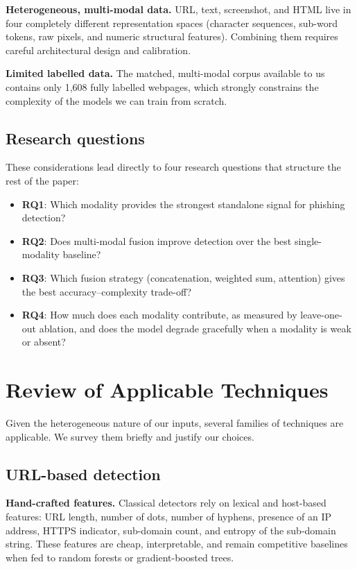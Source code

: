 \documentclass[conference]{IEEEtran}
\begin{document}
\noindent\textbf{Heterogeneous, multi-modal data.} URL, text,
screenshot, and HTML live in four completely different
representation spaces (character sequences, sub-word tokens, raw
pixels, and numeric structural features). Combining them requires
careful architectural design and calibration.

\noindent\textbf{Limited labelled data.} The matched, multi-modal
corpus available to us contains only 1{,}608 fully labelled webpages,
which strongly constrains the complexity of the models we can train
from scratch.

\subsection{Research questions}
These considerations lead directly to four research questions that
structure the rest of the paper:
\begin{itemize}
  \item \textbf{RQ1}: Which modality provides the strongest standalone
  signal for phishing detection?
  \item \textbf{RQ2}: Does multi-modal fusion improve detection over
  the best single-modality baseline?
  \item \textbf{RQ3}: Which fusion strategy (concatenation, weighted
  sum, attention) gives the best accuracy--complexity trade-off?
  \item \textbf{RQ4}: How much does each modality contribute, as
  measured by leave-one-out ablation, and does the model degrade
  gracefully when a modality is weak or absent?
\end{itemize}

\section{Review of Applicable Techniques}
Given the heterogeneous nature of our inputs, several families of
techniques are applicable. We survey them briefly and justify our
choices.

\subsection{URL-based detection}
\noindent\textbf{Hand-crafted features.} Classical detectors rely on
lexical and host-based features: URL length, number of dots, number
of hyphens, presence of an IP address, HTTPS indicator, sub-domain
count, and entropy of the sub-domain string. These features are
cheap, interpretable, and remain competitive baselines when fed to
random forests or gradient-boosted trees.
\end{document}
